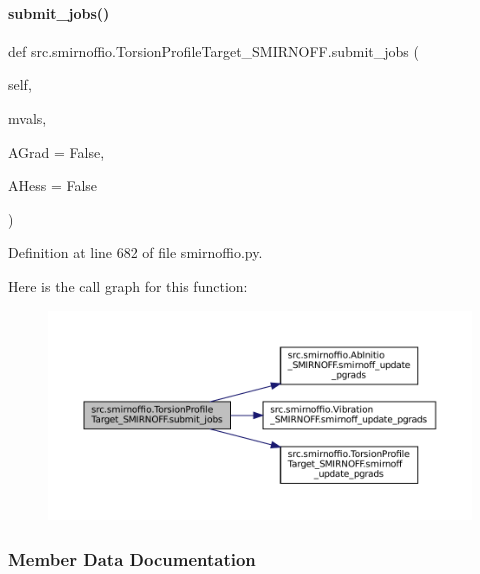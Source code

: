 \paragraph{\texorpdfstring{submit\+\_\+jobs()}{submit\_jobs()}}
{\footnotesize\ttfamily def src.\+smirnoffio.\+Torsion\+Profile\+Target\+\_\+\+S\+M\+I\+R\+N\+O\+F\+F.\+submit\+\_\+jobs (\begin{DoxyParamCaption}\item[{}]{self,  }\item[{}]{mvals,  }\item[{}]{A\+Grad = {\ttfamily False},  }\item[{}]{A\+Hess = {\ttfamily False} }\end{DoxyParamCaption})}



Definition at line 682 of file smirnoffio.\+py.

Here is the call graph for this function\+:
\nopagebreak
\begin{figure}[H]
\begin{center}
\leavevmode
\includegraphics[width=350pt]{classsrc_1_1smirnoffio_1_1TorsionProfileTarget__SMIRNOFF_a4a71652fa1206b607250815908368e91_cgraph}
\end{center}
\end{figure}


\subsubsection{Member Data Documentation}
\mbox{\label{classsrc_1_1smirnoffio_1_1TorsionProfileTarget__SMIRNOFF_a223fc7a7784e65adee511af84a927834}} 
